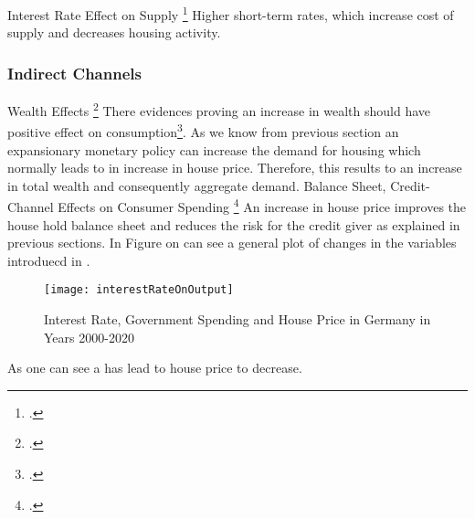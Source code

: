 Interest Rate Effect on Supply \footcite[See.][]{Mishkin2007}
Higher short-term rates, which increase cost of supply and decreases housing activity.

\subsubsection{Indirect Channels}
Wealth Effects \footcite[See.][]{Mishkin2007}
There evidences proving an increase in wealth should have positive effect on consumption\footcite[See.][]{Mishkin2007}. As we know from previous section an expansionary monetary policy can increase the demand for housing which normally leads to in increase in house price. Therefore, this results to an increase in total wealth and consequently aggregate demand.
Balance Sheet, Credit-Channel Effects on Consumer Spending \footcite[See.][]{Mishkin2007}
An increase in house price improves the house hold balance sheet and reduces the risk for the credit giver as explained in previous sections.
In Figure on can see a general plot of changes in the variables introduecd in .
\begin{figure}[H]
\caption{Interest Rate, Government Spending and House Price in Germany in Years 2000-2020}
\texttt{[image: interestRateOnOutput]}
\\
\cite[Quelle: Own Graph][]{FOM}
\end{figure}

As one can see a has lead to house price to decrease.

